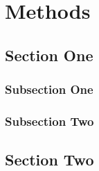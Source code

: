 \chapter{Methods}
\section{Section One}
\subsection{Subsection One}
\subsection{Subsection Two}
\section{Section Two}
